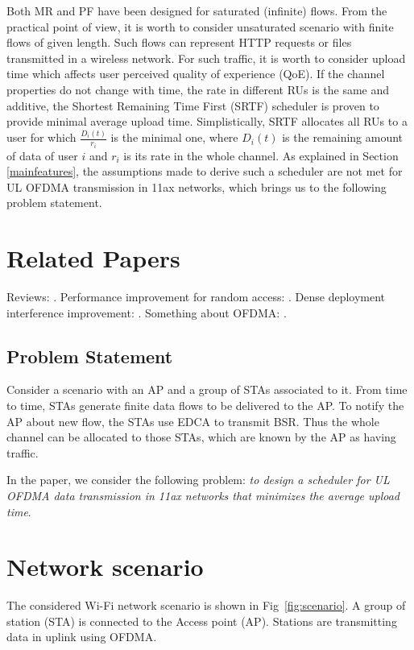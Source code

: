 Both MR and PF have been designed for saturated (infinite) flows.
From the practical point of view, it is worth to consider unsaturated scenario with finite flows of given length.
Such flows can represent HTTP requests or files transmitted in a wireless network.
For such traffic, it is worth to consider upload time which affects user perceived quality of experience (QoE).
If the channel properties do not change with time, the rate in different RUs is the same and additive, the Shortest Remaining Time First (SRTF) scheduler is proven to provide minimal average upload time.
Simplistically, SRTF allocates all RUs to a user for which $\frac{D_i(t)}{r_i}$ is the minimal one, where $D_i(t)$ is the remaining amount of data of user $i$ and $r_i$ is its rate in the whole channel.
As explained in Section \ref{mainfeatures}, the assumptions made to derive such a scheduler are not met for UL OFDMA transmission in 11ax networks, which brings us to the following problem statement.
\section{Related Papers}
Reviews: \cite{khorov2015ieee, bellalta2016ieee}.
Performance improvement for random access: \cite{khorov2016several}.
Dense deployment interference improvement: \cite{khorov2016joint}.
Something about OFDMA: \cite{qu2015ofdma}.

\subsection{Problem Statement}
\label{problem}
Consider a scenario with an AP and a group of STAs associated to it.
From time to time, STAs generate finite data flows to be delivered to the AP. To notify the AP about new flow, the STAs use EDCA to transmit BSR. Thus the whole channel can be allocated to those STAs, which are known by the AP as having traffic. 

In the paper, we consider the following problem: \emph{to design a scheduler for UL OFDMA data transmission in 11ax networks that minimizes the average upload time}.

\section{Network scenario}
The considered Wi-Fi network scenario is shown in Fig~\ref{fig:scenario}. A group of station (STA) is connected to the Access point (AP). Stations are transmitting data in uplink using OFDMA. 

